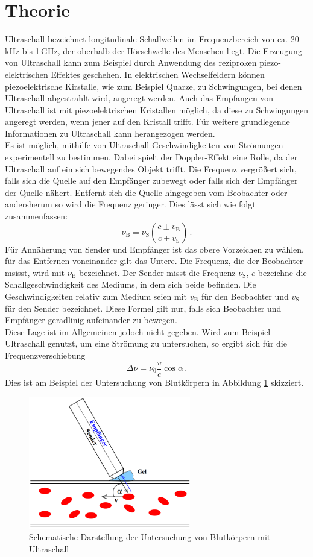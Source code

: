 \section{Theorie}
\label{sec:Theorie}
Ultraschall bezeichnet longitudinale Schallwellen im Frequenzbereich von ca.
20\,kHz bis 1\,GHz, der oberhalb der Hörschwelle des Menschen liegt.
Die Erzeugung von Ultraschall kann zum Beispiel durch Anwendung des reziproken piezo-elektrischen
Effektes geschehen. In elektrischen Wechselfeldern können piezoelektrische Kirstalle, wie zum Beispiel Quarze,
zu Schwingungen, bei denen Ultraschall abgestrahlt wird, angeregt werden. Auch das Empfangen
von Ultraschall ist mit piezoelektrischen Kristallen möglich, da diese zu Schwingungen
angeregt werden, wenn jener auf den Kristall trifft.
Für weitere grundlegende Informationen zu Ultraschall kann \cite{VersuchsanleitungUS2}
herangezogen werden.\\
Es ist möglich, mithilfe von Ultraschall Geschwindigkeiten von Strömungen experimentell
zu bestimmen. Dabei spielt der Doppler-Effekt eine Rolle, da der Ultraschall auf
ein sich bewegendes Objekt trifft. Die Frequenz vergrößert sich, falls sich die Quelle auf den
Empfänger zubewegt oder falls sich der Empfänger der Quelle nähert. Entfernt sich die Quelle
hingegeben vom Beobachter oder andersherum so wird die Frequenz geringer. Dies lässt sich wie folgt
zusammenfassen:
\begin{equation}
  \nu_\text{B} = \nu_\text{S} \left(\frac{c \pm v_\text{B}}{c \mp v_\text{S}}\right)\,.
\end{equation}
Für Annäherung von Sender und Empfänger ist das obere Vorzeichen zu wählen, für
das Entfernen voneinander gilt das Untere. Die Frequenz, die der Beobachter msisst,
wird mit $\nu_\text{B}$ bezeichnet. Der Sender misst die Frequenz $\nu_\text{S}$, $c$ bezeichne
die Schallgeschwindigkeit des Mediums, in dem sich beide befinden. Die Geschwindigkeiten
relativ zum Medium seien mit $v_\text{B}$ für den Beobachter und $v_\text{S}$ für den
Sender bezeichnet. Diese Formel gilt nur, falls sich Beobachter und Empfänger geradlinig
aufeinander zu bewegen.\\
Diese Lage ist im Allgemeinen jedoch nicht gegeben. Wird zum Beispiel Ultraschall
genutzt, um eine Strömung zu untersuchen, so ergibt sich für die Frequenzverschiebung
\begin{equation}
  \Delta \nu = \nu_0 \frac{v}{c} \cos \alpha\,.
\end{equation}
Dies ist am Beispiel der Untersuchung von Blutkörpern in Abbildung \ref{fig:theorieskizze}
skizziert.

\begin{figure}
  \centering
  \includegraphics[width=200pt]{data/dopplerskizze.png}
  \caption{Schematische Darstellung der Untersuchung von Blutkörpern mit Ultraschall\,\cite{Versuchsanleitung}}
  \label{fig:theorieskizze}
\end{figure}
